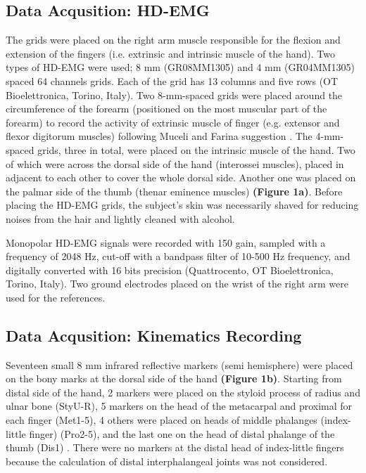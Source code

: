 \documentclass[conference]{IEEEtran}
\begin{document}
\subsection{Data Acqusition: HD-EMG}
The grids were placed on the right arm muscle responsible for the flexion and extension of the fingers (i.e. extrinsic and intrinsic muscle of the hand). Two types of HD-EMG were used; 8 mm (GR08MM1305) and 4 mm (GR04MM1305) spaced 64 channels grids. Each of the grid has 13 columns and five rows (OT Bioelettronica, Torino, Italy). Two 8-mm-spaced grids were placed around the circumference of the forearm (positioned on the most muscular part of the forearm) to record the activity of extrinsic muscle of finger (e.g. extensor and flexor digitorum muscles) following Muceli and Farina suggestion \cite{b9}. The 4-mm-spaced grids, three in total, were placed on the intrinsic muscle of the hand. Two of which were across the dorsal side of the hand (interossei muscles), placed in adjacent to each other to cover the whole dorsal side. Another one was placed on the palmar side of the thumb (thenar eminence muscles) \textbf{(Figure 1a)}. Before placing the HD-EMG grids, the subject’s skin was necessarily shaved for reducing noises from the hair and lightly cleaned 
with alcohol.

Monopolar HD-EMG signals were recorded with 150 gain, sampled with a frequency of 2048 Hz, cut-off with a bandpass filter of 10-500 Hz frequency, and digitally converted with 16 bits precision 
(Quattrocento, OT Bioelettronica, Torino, Italy). Two ground electrodes placed on the wrist of the right arm were used for the references.

\subsection{Data Acqusition: Kinematics Recording}
Seventeen small 8 mm infrared reflective markers (semi hemisphere) were placed on the bony marks 
at the dorsal side of the hand \textbf{(Figure 1b)}. Starting from distal side of the hand, 2 markers were placed on 
the styloid process of radius and ulnar bone (StyU-R), 5 markers on the head of the metacarpal and proximal 
for each finger (Met1-5), 4 others were placed on heads of middle phalanges (index-little finger) (Pro2-5), 
and the last one on the head of distal phalange of the thumb (Dis1) \cite{b25}. There were no markers at the distal 
head of index-little fingers because the calculation of distal interphalangeal joints was not considered.
\end{document}
